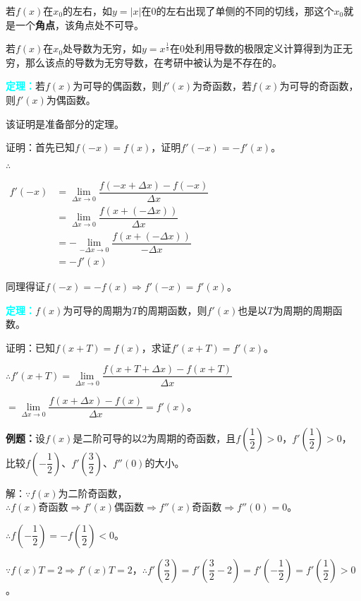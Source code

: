 \documentclass[UTF8, 12pt]{ctexart}
\begin{document}
        若$f(x)$在$x_0$的左右，如$y=\vert x\vert$在$0$的左右出现了单侧的不同的切线，那这个$x_0$就是一个\textbf{角点}，该角点处不可导。

        若$f(x)$在$x_0$处导数为无穷，如$y=x^{\frac{1}{3}}$在$0$处利用导数的极限定义计算得到为正无穷，那么该点的导数为无穷导数，在考研中被认为是不存在的。

        \textcolor{aqua}{\textbf{定理：}}若$f(x)$为可导的偶函数，则$f'(x)$为奇函数，若$f(x)$为可导的奇函数，则$f'(x)$为偶函数。

        该证明是准备部分的定理。

        证明：首先已知$f(-x)=f(x)$，证明$f'(-x)=-f'(x)$。

        $\therefore$

        $
        \begin{aligned}
            f'(-x) &=\lim\limits_{\Delta x\to 0}\dfrac{f(-x+\Delta x)-f(-x)}{\Delta x} \\
            & =\lim\limits_{\Delta x\to 0}\dfrac{f(x+(-\Delta x))}{\Delta x} \\
            & =-\lim\limits_{-\Delta x\to 0}\dfrac{f(x+(-\Delta x))}{-\Delta x} \\
            & =-f'(x)
        \end{aligned}
        $

        同理得证$f(-x)=-f(x)\Rightarrow f'(-x)=f'(x)$。

        \textcolor{aqua}{\textbf{定理：}}$f(x)$为可导的周期为$T$的周期函数，则$f'(x)$也是以$T$为周期的周期函数。

        证明：已知$f(x+T)=f(x)$，求证$f'(x+T)=f'(x)$。\medskip

        $\therefore f'(x+T)=\lim\limits_{\Delta x\to 0}\dfrac{f(x+T+\Delta x)-f(x+T)}{\Delta x}$

        $=\lim\limits_{\Delta x\to 0}\dfrac{f(x+\Delta x)-f(x)}{\Delta x}=f'(x)$。

        \textbf{例题：}设$f(x)$是二阶可导的以2为周期的奇函数，且$f(\dfrac{1}{2})>0$，$f'(\dfrac{1}{2})>0$，比较$f(-\dfrac{1}{2})$、$f'(\dfrac{3}{2})$、$f''(0)$的大小。\medskip

        解：$\because f(x)$为二阶奇函数，$\therefore f(x)\text{奇函数}\Rightarrow f'(x)\text{偶函数}\Rightarrow f''(x)\text{奇函数}\Rightarrow f''(0)=0$。

        $\therefore f(-\dfrac{1}{2})=-f(\dfrac{1}{2})<0$。

        $\because f(x)T=2\Rightarrow f'(x)T=2$，$\therefore f'(\dfrac{3}{2})=f'(\dfrac{3}{2}-2)=f'(-\dfrac{1}{2})=f'(\dfrac{1}{2})>0$。
\end{document}
